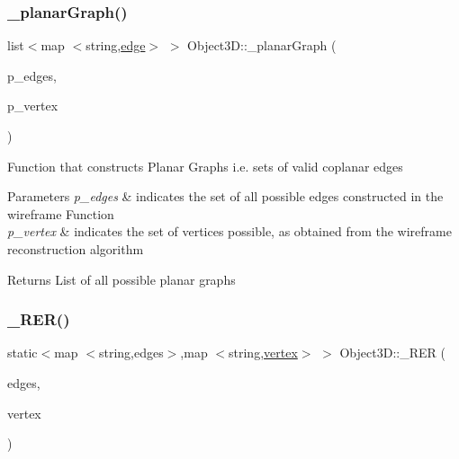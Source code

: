 \subsubsection{\texorpdfstring{\+\_\+planar\+Graph()}{\_planarGraph()}}
{\footnotesize\ttfamily list$<$map $<$string,\mbox{\hyperlink{structedge}{edge}}$>$ $>$ Object3\+D\+::\+\_\+planar\+Graph (\begin{DoxyParamCaption}\item[{map$<$ string, edges $>$}]{p\+\_\+edges,  }\item[{map$<$ string, \mbox{\hyperlink{structvertex}{vertex}} $>$}]{p\+\_\+vertex }\end{DoxyParamCaption})\hspace{0.3cm}{\ttfamily [protected]}}

Function that constructs Planar Graphs i.\+e. sets of valid coplanar edges 
\begin{DoxyParams}{Parameters}
{\em p\+\_\+edges} & indicates the set of all possible edges constructed in the wireframe Function \\
\hline
{\em p\+\_\+vertex} & indicates the set of vertices possible, as obtained from the wireframe reconstruction algorithm \\
\hline
\end{DoxyParams}
\begin{DoxyReturn}{Returns}
List of all possible planar graphs 
\end{DoxyReturn}
\mbox{\label{class_object3_d_a5f57ab4541390349bd0b996d2ca5592a}} 
\subsubsection{\texorpdfstring{\+\_\+\+R\+E\+R()}{\_RER()}}
{\footnotesize\ttfamily static$<$map $<$string,edges$>$,map $<$string,\mbox{\hyperlink{structvertex}{vertex}}$>$ $>$ Object3\+D\+::\+\_\+\+R\+ER (\begin{DoxyParamCaption}\item[{map$<$ string, edges $>$}]{edges,  }\item[{map$<$ string, \mbox{\hyperlink{structvertex}{vertex}} $>$}]{vertex }\end{DoxyParamCaption})\hspace{0.3cm}{\ttfamily [protected]}}

